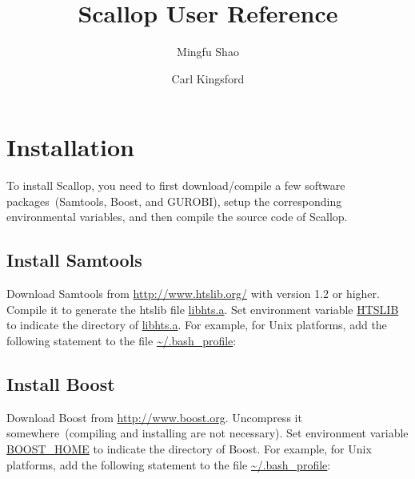 \documentclass{llncs}
\begin{document}
%
\frontmatter          %
%
\pagestyle{headings}  %
%
%
\mainmatter              %
%
\title{Scallop User Reference}
%
%
\author{Mingfu Shao \and Carl Kingsford}
%
%

\maketitle              %

\section{Installation}
To install Scallop, you need to first download/compile a few software packages~(Samtools,
Boost, and GUROBI), setup the corresponding environmental variables, and then
compile the source code of Scallop.

\subsection{Install Samtools}
Download Samtools from \url{http://www.htslib.org/} with version 1.2 or higher.
Compile it to generate the htslib file \url{libhts.a}. Set environment variable
\url{HTSLIB} to indicate the directory of \url{libhts.a}. 
For example, for Unix platforms, add the following
statement to the file \url{~/.bash_profile}:\\

\subsection{Install Boost}
Download Boost from \url{http://www.boost.org}. Uncompress it
somewhere~(compiling and installing are not necessary). Set environment
variable \url{BOOST_HOME} to indicate the directory of Boost.
For example, for Unix platforms, add the following
statement to the file \url{~/.bash_profile}:\\
\end{document}
